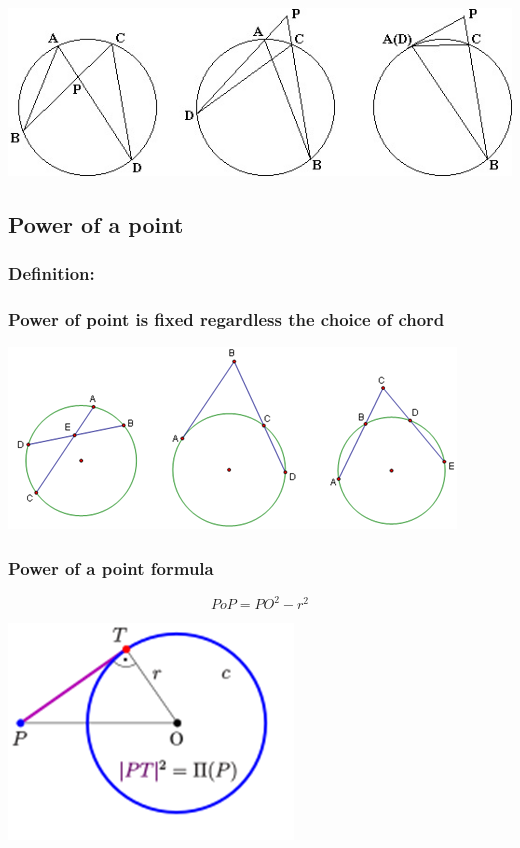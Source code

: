 \documentclass{article}
\begin{document}
\includegraphics[scale=.75]{Picture12.jpg}

\vspace{100px}

\subsection{Power of a point}

\subsubsection{Definition:}

\vspace{20px}

\subsubsection{Power of point is fixed regardless the choice of chord}

\includegraphics[scale=1.2]{Picture13.png}

\pagebreak

\subsubsection{Power of a point formula}

\[PoP = {PO}^2-r^2\]

\begin{center}
\includegraphics{Picture14.png}
\end{center}
\end{document}
